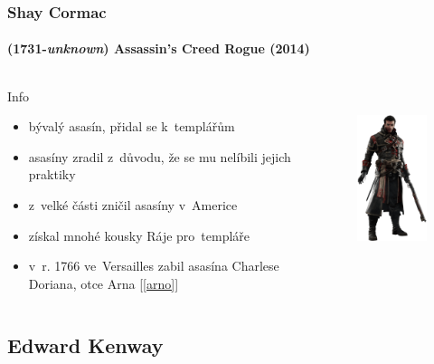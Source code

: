\documentclass[hyperref={colorlinks, linkcolor=white, urlcolor=green!50!black}]{beamer}
\begin{document}
\begin{frame}\label{shay}
\frametitle{Shay Cormac}
\framesubtitle{(1731-\textit{unknown}) \hfill Assassin's Creed Rogue (2014)}
\begin{columns}[c]
	
	\begin{block}{Info}
		\begin{itemize}
			\item bývalý asasín, přidal se k~templářům
			\item asasíny zradil z~důvodu, že se mu nelíbili jejich praktiky
			\item z~velké části zničil asasíny v~Americe
			\item získal mnohé kousky Ráje pro~templáře
			\item v~r. 1766 ve~Versailles zabil asasína Charlese Doriana, otce Arna [\ref{arno}]
		\end{itemize}
	\end{block}
	
	\begin{figure}[h]
		\centering
		\includegraphics[height=200px]{char_shay}
	\end{figure}
	
\end{columns}
\end{frame}

\subsection[Edward]{Edward Kenway}
\end{document}
